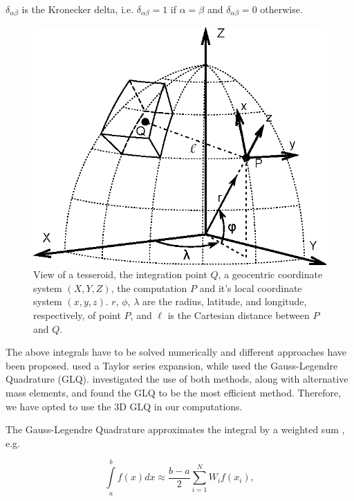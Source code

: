 \documentclass[paper,twocolumn,twoside]{geophysics}
\begin{document}
\noindent
$\delta_{\alpha\beta}$ is the Kronecker delta,
i.e. $\delta_{\alpha\beta}=1$ if $\alpha=\beta$
and $\delta_{\alpha\beta}=0$ otherwise.

\begin{figure}
    \centering
    \includegraphics[width=\columnwidth]{figs/tesseroid}
    \caption{
        View of a tesseroid,
        the integration point $Q$,
        a geocentric coordinate system $(X, Y, Z)$,
        the computation $P$ and it's local coordinate system $(x, y, z)$.
        $r$, $\phi$, $\lambda$ are
        the radius, latitude, and longitude, respectively, of point $P$,
        and $\ell$ is the Cartesian distance between $P$ and $Q$.
    }
    \label{fig:tesseroid}
\end{figure}

The above integrals
have to be solved numerically
\citep{Wild-Pfeiffer2008}
and different approaches have been proposed.
\citet{Heck2007}
used a Taylor series expansion,
while \citet{Asgharzadeh2007}
used the Gauss-Legendre Quadrature (GLQ).
\citet{Wild-Pfeiffer2008} investigated
the use of both methods,
along with alternative mass elements,
and found the GLQ to be the most efficient method.
Therefore, we have opted to use
the 3D GLQ in our computations.

The Gauss-Legendre Quadrature
approximates the integral by
a weighted sum
\citep{Hildebrand1987},
e.g.

\begin{equation}
    \int\limits_a^b f(x) dx \approx
    \frac{b-a}{2}\sum\limits_{i=1}^N W_i f(x_i),
\end{equation}
\end{document}
